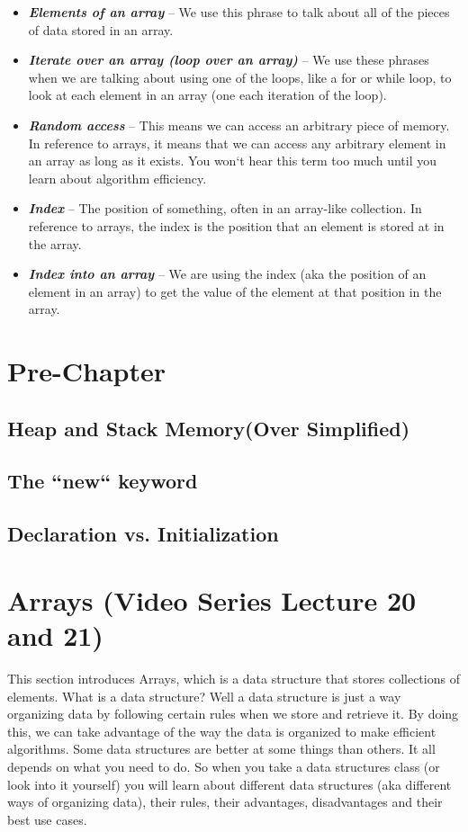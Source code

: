 \documentclass[11]{article}
\begin{document}
\begin{itemize}
  \item \textbf{\textit{Elements of an array}} -- We use this phrase to talk about all of the pieces of data stored in an array.
  
  \item \textbf{\textit{Iterate over an array (loop over an array)}} -- We use these phrases when we are talking about using one of the loops, like a for or while loop, to look at each element in an array (one each iteration of the loop).
  
  \item \textbf{\textit{Random access}} -- This means we can access an arbitrary piece of memory. In reference to arrays, it means that we can access any arbitrary element in an array as long as it exists. You won`t hear this term too much until you learn about algorithm efficiency.
  
  \item \textbf{\textit{Index}} -- The position of something, often in an array-like collection. In reference to arrays, the index is the position that an element is stored at in the array.
  
  \item \textbf{\textit{Index into an array}} -- We are using the index (aka the position of an element in an array) to get the value of the element at that position in the array.
  
\end{itemize}
\section{Pre-Chapter}
\subsection{Heap and Stack Memory(Over Simplified)}
\label{sec:heap}

\subsection{The ``new`` keyword}
\subsection{Declaration vs. Initialization}
\section{Arrays (Video Series Lecture 20 and 21)}
This section introduces Arrays, which is a data structure that stores collections of elements. What is a data structure? Well a data structure is just a way organizing data by following certain rules when we store and retrieve it. By doing this, we can take advantage of the way the data is organized to make efficient algorithms. Some data structures are better at some things than others. It all depends on what you need to do. So when you take a data structures class (or look into it yourself) you will learn about different data structures (aka different ways of organizing data), their rules, their advantages, disadvantages and their best use cases.\\
\end{document}
